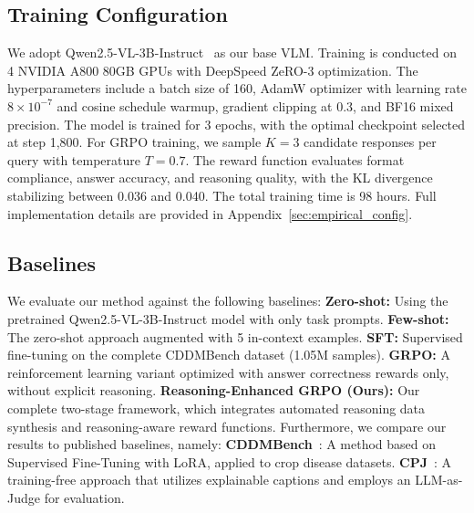 \documentclass[11pt]{article}
\begin{document}


\subsection{Training Configuration}

We adopt Qwen2.5-VL-3B-Instruct~\cite{bai2025qwen2} as our base VLM. Training is conducted on 4 NVIDIA A800 80GB GPUs with DeepSpeed ZeRO-3 optimization. The hyperparameters include a batch size of 160, AdamW optimizer with learning rate $8\times10^{-7}$ and cosine schedule warmup, gradient clipping at 0.3, and BF16 mixed precision. The model is trained for 3 epochs, with the optimal checkpoint selected at step 1,800. For GRPO training, we sample $K=3$ candidate responses per query with temperature $T=0.7$. The reward function evaluates format compliance, answer accuracy, and reasoning quality, with the KL divergence stabilizing between 0.036 and 0.040. The total training time is 98 hours. Full implementation details are provided in Appendix~\ref{sec:empirical_config}.


\subsection{Baselines}

We evaluate our method against the following baselines: \textbf{Zero-shot:} Using the pretrained Qwen2.5-VL-3B-Instruct model with only task prompts. \textbf{Few-shot:} The zero-shot approach augmented with 5 in-context examples. \textbf{SFT:} Supervised fine-tuning on the complete CDDMBench dataset (1.05M samples). \textbf{GRPO:} A reinforcement learning variant optimized with answer correctness rewards only, without explicit reasoning. \textbf{Reasoning-Enhanced GRPO (Ours):} Our complete two-stage framework, which integrates automated reasoning data synthesis and reasoning-aware reward functions.
Furthermore, we compare our results to published baselines, namely: \textbf{CDDMBench}~\cite{lu2024application}: A method based on Supervised Fine-Tuning with LoRA, applied to crop disease datasets. \textbf{CPJ}~\cite{zhang2025cpjexplainableagriculturalpest}: A training-free approach that utilizes explainable captions and employs an LLM-as-Judge for evaluation.
\end{document}
